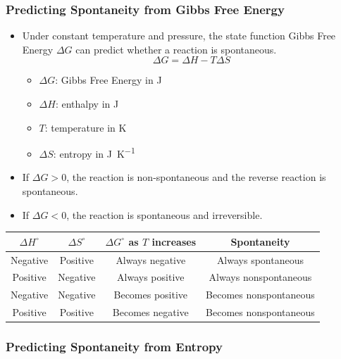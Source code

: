 \documentclass{article}
\begin{document}
\subsubsection{Predicting Spontaneity from Gibbs Free Energy}

\begin{itemize}
    \item Under constant temperature and pressure, the state function Gibbs Free Energy $\Delta G$ can predict whether a reaction is spontaneous.
    \begin{equation*}
        \Delta G = \Delta H - T \Delta S
    \end{equation*}
    \begin{itemize}
        \item $\Delta G$: Gibbs Free Energy in \si{\joule}
        \item $\Delta H$: enthalpy in \si{\joule}
        \item $T$: temperature in \si{\kelvin}
        \item $\Delta S$: entropy in \si[per-mode = fraction]{\joule\per\kelvin}
    \end{itemize}
    \item If $\Delta G > 0$, the reaction is non-spontaneous and the reverse reaction is spontaneous.
    \item If $\Delta G < 0$, the reaction is spontaneous and irreversible. 
\end{itemize}

\begin{center}
    \begin{tabular}{|c|c|c|c|}
        \hline $\Delta H^\circ$ & $\Delta S^\circ$ & $\Delta G^\circ$ as $T$ increases & Spontaneity \\
        \hline Negative & Positive & Always negative & Always spontaneous \\
        \hline Positive & Negative & Always positive & Always nonspontaneous \\
        \hline Negative & Negative & Becomes positive & Becomes nonspontaneous \\
        \hline Positive & Positive & Becomes negative & Becomes nonspontaneous \\
        \hline
    \end{tabular}
\end{center}

\subsubsection{Predicting Spontaneity from Entropy}
\end{document}

